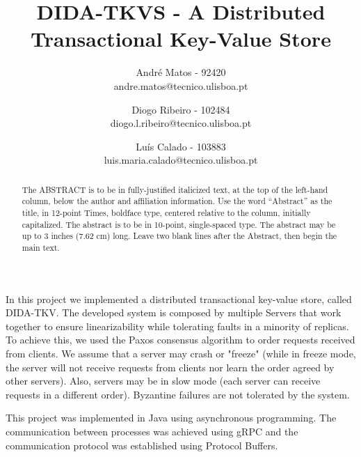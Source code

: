 \documentclass[times, 10pt,twocolumn]{article}
\begin{document}
\title{DIDA-TKVS - A Distributed Transactional Key-Value Store}

\author{André Matos - 92420\\
andre.matos@tecnico.ulisboa.pt\\
\and
Diogo Ribeiro - 102484\\
diogo.l.ribeiro@tecnico.ulisboa.pt\\
\and
Luís Calado - 103883\\
luis.maria.calado@tecnico.ulisboa.pt\\
}

\maketitle
\thispagestyle{empty}

\begin{abstract}
   The ABSTRACT is to be in fully-justified italicized text, at the top 
   of the left-hand column, below the author and affiliation 
   information. Use the word ``Abstract'' as the title, in 12-point 
   Times, boldface type, centered relative to the column, initially 
   capitalized. The abstract is to be in 10-point, single-spaced type. 
   The abstract may be up to 3 inches (7.62 cm) long. Leave two blank 
   lines after the Abstract, then begin the main text. 
\end{abstract}




In this project we implemented a distributed transactional
key-value store, called DIDA-TKV. The developed system is
composed by multiple Servers that work together to ensure
linearizability while tolerating faults in a minority of
replicas. To achieve this, we used the Paxos
consensus algorithm to order requests received from clients.
We assume that a server may crash or "freeze" (while in freeze mode, the
server will not receive requests from clients nor learn the order
agreed by other servers). Also, servers may be in slow mode
(each server can receive requests in a different order).
Byzantine failures are not tolerated by the system.

This project was implemented in Java using asynchronous
programming. The communication between processes was
achieved using gRPC and the communication protocol was
established using Protocol Buffers.

\end{document}

